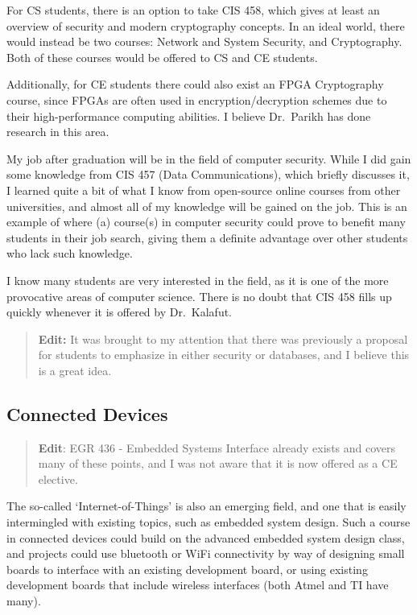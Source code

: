 \documentclass[12pt]{article}
\numberwithin{figure}{section}
\numberwithin{equation}{section}
\begin{document}
{\bigskip

For CS students, there is an option to take CIS 458, which gives at
least an overview of security and modern cryptography concepts. In an
ideal world, there would instead be two courses: Network and System
Security, and Cryptography. Both of these courses would be offered to CS
and CE students.

\bigskip

Additionally, for CE students there could also exist an FPGA
Cryptography course, since FPGAs are often used in encryption/decryption
schemes due to their high-performance computing abilities. I believe
Dr.~Parikh has done research in this area.

\bigskip

My job after graduation will be in the field of computer security. While
I did gain some knowledge from CIS 457 (Data Communications), which
briefly discusses it, I learned quite a bit of what I know from
open-source online courses from other universities, and almost all of my
knowledge will be gained on the job. This is an example of where (a)
course(s) in computer security could prove to benefit many students in
their job search, giving them a definite advantage over other students
who lack such knowledge.

\bigskip

I know many students are very interested in the field, as it is one of
the more provocative areas of computer science. There is no doubt that
CIS 458 fills up quickly whenever it is offered by Dr.~Kalafut.

\bigskip

\begin{quote}
\textbf{Edit:} It was brought to my attention that there was previously a proposal for students to emphasize in either security or databases, and I believe this is a great idea.
\end{quote}

\subsection{Connected Devices}\label{connected-devices}
\begin{quote}
\textbf{Edit}: EGR 436 - Embedded Systems Interface already
exists and covers many of these points, and I was not aware that it is now offered as a CE elective.
\end{quote}

The so-called `Internet-of-Things' is also an emerging field, and one
that is easily intermingled with existing topics, such as embedded
system design. Such a course in connected devices could build on the
advanced embedded system design class, and projects could use bluetooth
or WiFi connectivity by way of designing small boards to interface with
an existing development board, or using existing development boards that
include wireless interfaces (both Atmel and TI have many).

}
\end{document}
